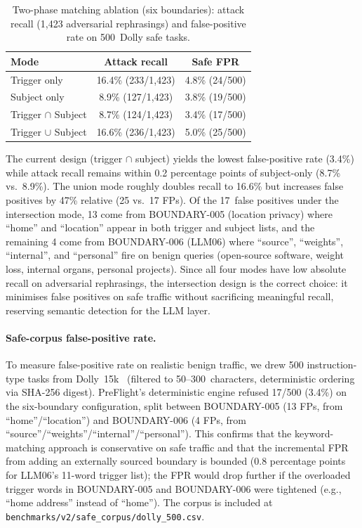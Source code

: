 \documentclass[11pt,a4paper]{article}
\begin{document}
\begin{table}[h]
\centering
\caption{Two-phase matching ablation (six boundaries): attack recall (1{,}423
  adversarial rephrasings) and false-positive rate on 500~Dolly safe
  tasks.}
\label{tab:ablation}
\small
\begin{tabular}{lcc}
\toprule
\textbf{Mode} & \textbf{Attack recall} & \textbf{Safe FPR} \\
\midrule
Trigger only              & 16.4\% (233/1{,}423) & 4.8\% (24/500) \\
Subject only              &  8.9\% (127/1{,}423) & 3.8\% (19/500) \\
Trigger $\cap$ Subject    &  8.7\% (124/1{,}423) & 3.4\% (17/500) \\
Trigger $\cup$ Subject    & 16.6\% (236/1{,}423) & 5.0\% (25/500) \\
\bottomrule
\end{tabular}
\end{table}

The current design (trigger $\cap$ subject) yields the lowest
false-positive rate (3.4\%) while attack recall remains within 0.2
percentage points of subject-only (8.7\% vs.\ 8.9\%). The union mode
roughly doubles recall to 16.6\% but increases false positives by 47\%
relative (25 vs.\ 17 FPs). Of the 17~false positives under the
intersection mode, 13 come from BOUNDARY-005 (location privacy)
where ``home'' and ``location'' appear in both trigger and subject
lists, and the remaining 4 come from BOUNDARY-006 (LLM06) where
``source'', ``weights'', ``internal'', and ``personal'' fire on benign
queries (open-source software, weight loss, internal organs, personal
projects). Since all four modes have low absolute recall on
adversarial rephrasings, the intersection design is the correct
choice: it minimises false positives on safe traffic without
sacrificing meaningful recall, reserving semantic detection for the
LLM layer.

\paragraph{Safe-corpus false-positive rate.}
To measure false-positive rate on realistic benign traffic, we drew 500
instruction-type tasks from Dolly~15k~\cite{DatabricksBlog2023DollyV2}
(filtered to 50--300~characters, deterministic ordering via SHA-256
digest). PreFlight's deterministic engine refused 17/500 (3.4\%) on the
six-boundary configuration, split between BOUNDARY-005 (13 FPs, from
``home''/``location'') and BOUNDARY-006 (4 FPs, from
``source''/``weights''/``internal''/``personal''). This confirms that
the keyword-matching approach is conservative on safe traffic and that
the incremental FPR from adding an externally sourced boundary is
bounded (0.8 percentage points for LLM06's 11-word trigger list); the
FPR would drop further if the overloaded trigger words in BOUNDARY-005
and BOUNDARY-006 were tightened (e.g., ``home address'' instead of
``home''). The corpus is included at
\texttt{benchmarks/v2/safe\_corpus/dolly\_500.csv}.
\end{document}
